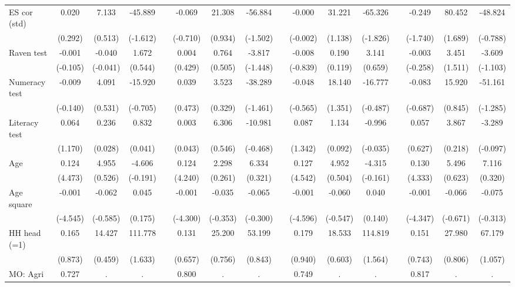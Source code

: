 {\begin{longtable}{@{\extracolsep{\fill}}lccccccccccccccc}
    ES cor (std) & 0.020 & 7.133 & -45.889 &   & -0.069 & 21.308 & -56.884 &   & -0.000 & 31.221 & -65.326 &   & -0.249 & 80.452 & -48.824 \\
      & (0.292) & (0.513) & (-1.612) &   & (-0.710) & (0.934) & (-1.502) &   & (-0.002) & (1.138) & (-1.826) &   & (-1.740) & (1.689) & (-0.788) \\
    Raven test & -0.001 & -0.040 & 1.672 &   & 0.004 & 0.764 & -3.817 &   & -0.008 & 0.190 & 3.141 &   & -0.003 & 3.451 & -3.609 \\
      & (-0.105) & (-0.041) & (0.544) &   & (0.429) & (0.505) & (-1.448) &   & (-0.839) & (0.119) & (0.659) &   & (-0.258) & (1.511) & (-1.103) \\
    Numeracy test & -0.009 & 4.091 & -15.920 &   & 0.039 & 3.523 & -38.289 &   & -0.048 & 18.140 & -16.777 &   & -0.083 & 15.920 & -51.161 \\
      & (-0.140) & (0.531) & (-0.705) &   & (0.473) & (0.329) & (-1.461) &   & (-0.565) & (1.351) & (-0.487) &   & (-0.687) & (0.845) & (-1.285) \\
    Literacy test & 0.064 & 0.236 & 0.832 &   & 0.003 & 6.306 & -10.981 &   & 0.087 & 1.134 & -0.996 &   & 0.057 & 3.867 & -3.289 \\
      & (1.170) & (0.028) & (0.041) &   & (0.043) & (0.546) & (-0.468) &   & (1.342) & (0.092) & (-0.035) &   & (0.627) & (0.218) & (-0.097) \\
    Age & 0.124 & 4.955 & -4.606 &   & 0.124 & 2.298 & 6.334 &   & 0.127 & 4.952 & -4.315 &   & 0.130 & 5.496 & 7.116 \\
      & (4.473) & (0.526) & (-0.191) &   & (4.240) & (0.261) & (0.321) &   & (4.542) & (0.504) & (-0.161) &   & (4.333) & (0.623) & (0.320) \\
    Age square & -0.001 & -0.062 & 0.045 &   & -0.001 & -0.035 & -0.065 &   & -0.001 & -0.060 & 0.040 &   & -0.001 & -0.066 & -0.075 \\
      & (-4.545) & (-0.585) & (0.175) &   & (-4.300) & (-0.353) & (-0.300) &   & (-4.596) & (-0.547) & (0.140) &   & (-4.347) & (-0.671) & (-0.313) \\
    HH head (=1) & 0.165 & 14.427 & 111.778 &   & 0.131 & 25.200 & 53.199 &   & 0.179 & 18.533 & 114.819 &   & 0.151 & 27.980 & 67.179 \\
      & (0.873) & (0.459) & (1.633) &   & (0.657) & (0.756) & (0.843) &   & (0.940) & (0.603) & (1.564) &   & (0.743) & (0.806) & (1.057) \\
    MO: Agri & 0.727 & . & . &   & 0.800 & . & . &   & 0.749 & . & . &   & 0.817 & . & . \\

\end{longtable}}

